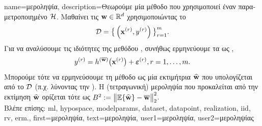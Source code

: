 {name={\foreignlanguage{greek}{μεροληψία}},
	description={\foreignlanguage{greek}{Θεωρούμε μία μέθοδο} 
		 \foreignlanguage{greek}{που χρησιμοποιεί έναν παραμετροποιημένο}  $\mathcal{H}$. 
		\foreignlanguage{greek}{Μαθαίνει τις}  ${\bf w} \in \mathbb{R}^{d}$ \foreignlanguage{greek}{χρησιμοποιώντας 
		το}  $$\mathcal{D}=\big\{ \left( {\bf x}^{(r)},y^{(r)} \right) \big\}_{r=1}^{m}.$$ 
		\foreignlanguage{greek}{Για να αναλύσουμε τις ιδιότητες της μεθόδου} , \foreignlanguage{greek}{συνήθως ερμηνεύουμε 
		τα}  \foreignlanguage{greek}{ως}   , 
		$$y^{(r)} = h^{(\overline{{\bf w}})}\big( {\bf x}^{(r)} \big) + \bm{\varepsilon}^{(r)}, r=1, \ldots, m.$$ 
		\foreignlanguage{greek}{Μπορούμε τότε να ερμηνεύσουμε τη μέθοδο}  \foreignlanguage{greek}{ως μία εκτιμήτρια $\widehat{{\bf w}}$ 
		που υπολογίζεται από το $\mathcal{D}$ (π.χ. λύνοντας την} ). \foreignlanguage{greek}{Η (τετραγωνική) μεροληψία που 
		προκαλείται από την εκτίμηση $\widehat{{\bf w}}$ ορίζεται τότε ως} $B^{2} := \big\| \mathbb{E} \{ \widehat{{\bf w}}  \}- \overline{{\bf w}}\big\|_{2}^{2}$.\\
		\foreignlanguage{greek}{Βλέπε επίσης:} \gls{ml}, \gls{hypospace}, \gls{modelparams}, \gls{dataset}, \gls{datapoint}, \gls{realization}, \gls{iid}, \gls{rv}, \gls{erm}.},
	first={\foreignlanguage{greek}{μεροληψία}},
	text={\foreignlanguage{greek}{μεροληψία}},
	user1={\foreignlanguage{greek}{μεροληψία}}, %
	user2={\foreignlanguage{greek}{μεροληψίας}} %
}

